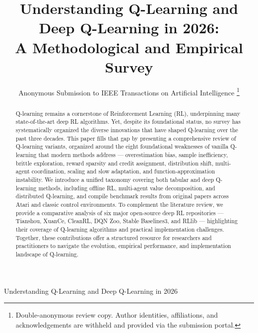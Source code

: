 \documentclass[journal]{IEEEtran}
\begin{document}
\title{Understanding Q-Learning and Deep Q-Learning in 2026:\\
A Methodological and Empirical Survey}

\newif\ifanon
\anontrue

\ifanon
  \author{Anonymous Submission to IEEE Transactions on Artificial Intelligence%
  \thanks{Double-anonymous review copy. Author identities, affiliations, and
  acknowledgements are withheld and provided via the submission portal.}}
  {Understanding Q-Learning and Deep Q-Learning in 2026}
\else
  \author{Colby Wang, Ti, Divya, Kevin, Hamna, Logan,
  Eason Yishan Wu, Charles Jiahao Zhang, and Alp Guneysel%
  \thanks{E.~Y.~Wu is with Taipei, Taiwan Province of China.
  C.~J.~Zhang is with the University of Waterloo.
  Affiliations for the remaining authors are to be completed.
  \emph{Working copy --- set \texttt{\textbackslash anontrue} for the
  double-anonymous TAI submission build.}}}
  \markboth{IEEE Transactions on Artificial Intelligence,~Vol.~XX, No.~X, 2026}%
  {Wang \emph{et al.}: Understanding Q-Learning and Deep Q-Learning in 2026}
\fi

\maketitle

\begin{abstract}
Q-learning remains a cornerstone of Reinforcement Learning (RL), underpinning
many state-of-the-art deep RL algorithms. Yet, despite its foundational status,
no survey has systematically organized the diverse innovations that have shaped
Q-learning over the past three decades. This paper fills that gap by presenting
a comprehensive review of Q-learning variants, organized around the eight
foundational weaknesses of vanilla Q-learning that modern methods address ---
overestimation bias, sample inefficiency, brittle exploration, reward sparsity
and credit assignment, distribution shift, multi-agent coordination,
scaling and slow adaptation, and function-approximation instability. We introduce a unified
taxonomy covering both tabular and deep Q-learning methods, including offline
RL, multi-agent value decomposition, and distributed Q-learning, and compile
benchmark results from original papers across Atari and classic control
environments. To complement the literature review, we provide a comparative
analysis of six major open-source deep RL repositories --- Tianshou, XuanCe,
CleanRL, DQN Zoo, Stable Baselines3, and RLlib --- highlighting their coverage
of Q-learning algorithms and practical implementation challenges. Together,
these contributions offer a structured resource for researchers and
practitioners to navigate the evolution, empirical performance, and
implementation landscape of Q-learning.
\end{abstract}
\end{document}
